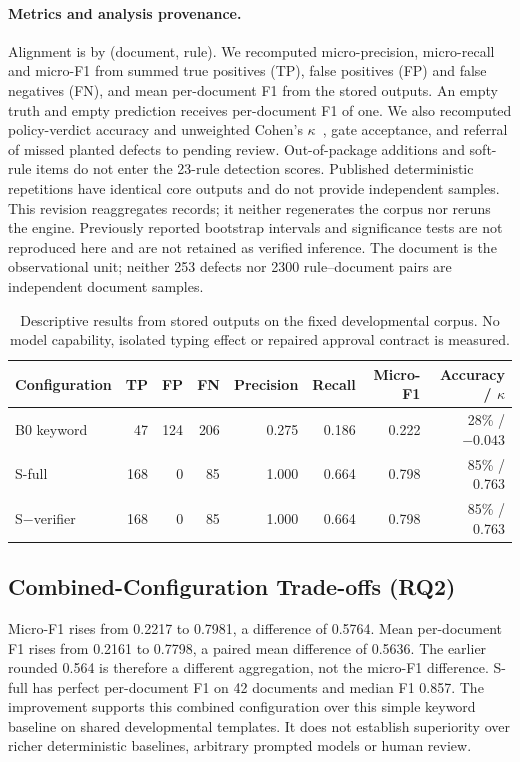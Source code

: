 \paragraph{Metrics and analysis provenance.}
Alignment is by (document, rule). We recomputed micro-precision, micro-recall and micro-F1 from summed true positives (TP), false positives (FP) and false negatives (FN), and mean per-document F1 from the stored outputs. An empty truth and empty prediction receives per-document F1 of one. We also recomputed policy-verdict accuracy and unweighted Cohen's $\kappa$~\cite{cohen1960,landis1977}, gate acceptance, and referral of missed planted defects to pending review. Out-of-package additions and soft-rule items do not enter the 23-rule detection scores. Published deterministic repetitions have identical core outputs and do not provide independent samples. This revision reaggregates records; it neither regenerates the corpus nor reruns the engine. Previously reported bootstrap intervals and significance tests are not reproduced here and are not retained as verified inference. The document is the observational unit; neither 253 defects nor 2300 rule--document pairs are independent document samples.

\begin{table}[!ht]
\caption{Descriptive results from stored outputs on the fixed developmental corpus. No model capability, isolated typing effect or repaired approval contract is measured.}
\label{tab:results}
\centering\footnotesize
\begin{tabular}{@{}lrrrrrrr@{}}
\toprule
Configuration & TP & FP & FN & Precision & Recall & Micro-F1 & Accuracy / $\kappa$ \\
\midrule
B0 keyword & 47 & 124 & 206 & 0.275 & 0.186 & 0.222 & 28\% / $-0.043$ \\
S-full & 168 & 0 & 85 & 1.000 & 0.664 & 0.798 & 85\% / 0.763 \\
S$-$verifier & 168 & 0 & 85 & 1.000 & 0.664 & 0.798 & 85\% / 0.763 \\
\bottomrule
\end{tabular}
\end{table}

\subsection{Combined-Configuration Trade-offs (RQ2)}

Micro-F1 rises from 0.2217 to 0.7981, a difference of 0.5764. Mean per-document F1 rises from 0.2161 to 0.7798, a paired mean difference of 0.5636. The earlier rounded 0.564 is therefore a different aggregation, not the micro-F1 difference. S-full has perfect per-document F1 on 42 documents and median F1 0.857. The improvement supports this combined configuration over this simple keyword baseline on shared developmental templates. It does not establish superiority over richer deterministic baselines, arbitrary prompted models or human review.

